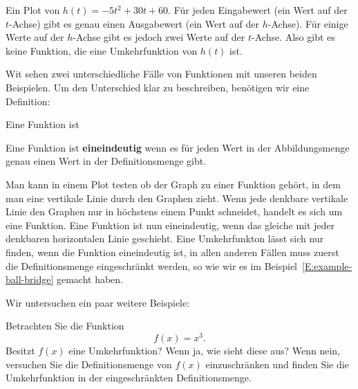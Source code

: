 \begin{marginfigure}[-5in]
\caption{
Ein Plot von $h(t)=-5t^2+30t+60$. Für jeden Eingabewert (ein Wert auf der $t$-Achse) gibt es genau einen Ausgabewert (ein Wert auf der $h$-Achse). Für einige Werte auf der $h$-Achse gibt es jedoch zwei Werte auf der $t$-Achse. Also gibt es keine Funktion, die eine Umkehrfunktion von $h(t)$ ist.}
\label{plot:fxn ball}
\end{marginfigure}

Wit sehen zwei unterschiedliche Fälle von Funktionen mit unseren beiden Beispielen. Um den Unterschied klar zu beschreiben, benötigen wir eine Definition:

\begin{definition}
Eine Funktion ist

Eine Funktion ist \textbf{eineindeutig} wenn es für jeden Wert in der Abbildungsmenge genau einen Wert in der Definitionsmenge gibt.
\end{definition}

Man kann in einem Plot testen ob der Graph zu einer Funktion gehört, in dem man eine vertikale Linie durch den Graphen zieht. Wenn jede denkbare vertikale Linie den Graphen nur in höchstens einem Punkt schneidet, handelt es sich um eine Funktion. Eine Funktion ist nun eineindeutig, wenn das gleiche mit jeder denkbaren horizontalen Linie geschieht. Eine Umkehrfunkton lässt sich nur finden, wenn die Funktion eineindeutig ist, in allen anderen Fällen muss zuerst die Definitionsmenge eingeschränkt werden, so wie wir es im Beispiel~\ref{E:example-ball-bridge} gemacht haben.


Wir untersuchen ein paar weitere Beispiele:



\begin{example}
Betrachten Sie die Funktion
\[
f(x) = x^3.
\]
Besitzt $f(x)$ eine Umkehrfunktion? Wenn ja, wie sieht diese aus? Wenn nein, versuchen Sie die Definitionsmenge von $f(x)$ einzuschränken und finden Sie die Umkehrfunktion in der eingeschränkten Definitionsmenge.
\end{example}


